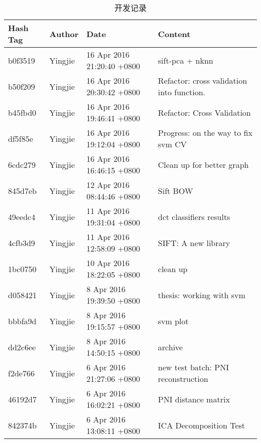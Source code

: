 
\begin{longtable}{@{\extracolsep{\fill}}l|l|l|l@{}}
\caption{开发记录} \\ 
    \hline
    Hash Tag & Author & Date & Content \\ \hline
     b0f3519 & Yingjie &  16 Apr 2016 21:20:40 +0800 & sift-pca + nknn                                      \\ \hline
    b50f209  & Yingjie &  16 Apr 2016 20:30:42 +0800 & Refactor: cross validation into function.            \\ \hline
    b45fbd0  & Yingjie &  16 Apr 2016 19:46:41 +0800 & Refactor: Cross Validation                           \\ \hline
    df5f85e  & Yingjie &  16 Apr 2016 19:12:04 +0800 & Progress: on the way to fix svm CV                   \\ \hline
    6cdc279  & Yingjie &  16 Apr 2016 16:46:15 +0800 & Clean up for better graph                            \\ \hline
    845d7eb  & Yingjie &  12 Apr 2016 08:44:46 +0800 & Sift BOW                                             \\ \hline
    49eedc4  & Yingjie &  11 Apr 2016 19:31:04 +0800 & dct classifiers results                              \\ \hline
    4cfb3d9  & Yingjie &  11 Apr 2016 12:58:09 +0800 & SIFT: A new library                                  \\ \hline
    1bc0750  & Yingjie &  10 Apr 2016 18:22:05 +0800 & clean up                                             \\ \hline
    d058421  & Yingjie &  8 Apr 2016 19:39:50 +0800  & thesis: working with svm                             \\ \hline
    bbbfa9d  & Yingjie &  8 Apr 2016 19:15:57 +0800  & svm plot                                             \\ \hline
    dd2c6ee  & Yingjie &  8 Apr 2016 14:50:15 +0800  & archive                                              \\ \hline
    f2de766  & Yingjie &  6 Apr 2016 21:27:06 +0800  & new test batch: PNI reconstruction                   \\ \hline
    46192d7  & Yingjie &  6 Apr 2016 16:02:21 +0800  & PNI distance matrix                                  \\ \hline
    842374b  & Yingjie &  6 Apr 2016 13:08:11 +0800  & ICA Decomposition Test                               \\ \hline

\end{longtable}
